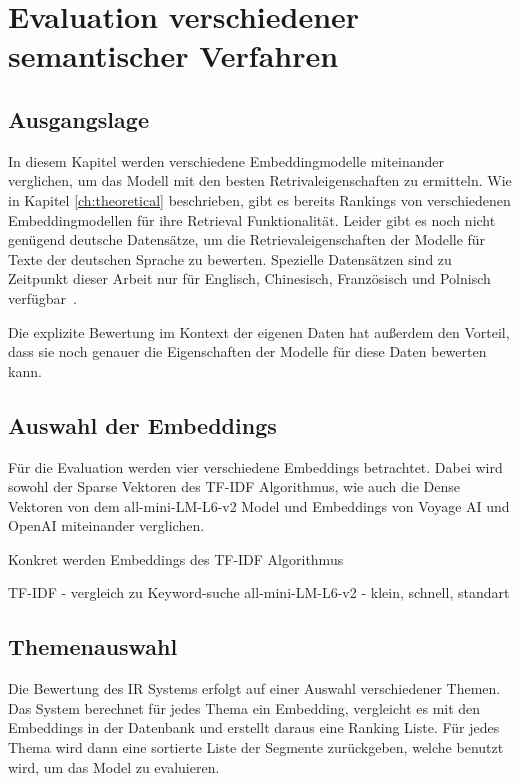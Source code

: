 \chapter{Evaluation verschiedener semantischer Verfahren}\label{ch:experiments}

\section{Ausgangslage}

In diesem Kapitel werden verschiedene Embeddingmodelle miteinander verglichen, um das Modell mit den besten Retrivaleigenschaften zu ermitteln.
Wie in Kapitel \autoref*{ch:theoretical} beschrieben, gibt es bereits Rankings von verschiedenen Embeddingmodellen für ihre Retrieval Funktionalität.
Leider gibt es noch nicht genügend deutsche Datensätze, um die Retrievaleigenschaften der Modelle für Texte der deutschen Sprache zu bewerten.
Spezielle Datensätzen sind zu Zeitpunkt dieser Arbeit nur für Englisch, Chinesisch, Französisch und Polnisch verfügbar~\cite{mteb}.

Die explizite Bewertung im Kontext der eigenen Daten hat außerdem den Vorteil, dass sie noch genauer die Eigenschaften der Modelle für diese Daten bewerten kann.


\section{Auswahl der Embeddings}

Für die Evaluation werden vier verschiedene Embeddings betrachtet.
Dabei wird sowohl der Sparse Vektoren des TF-IDF Algorithmus, wie auch die Dense Vektoren von dem all-mini-LM-L6-v2 Model und Embeddings von Voyage AI und OpenAI miteinander verglichen.

Konkret werden Embeddings des TF-IDF Algorithmus

TF-IDF - vergleich zu Keyword-suche
all-mini-LM-L6-v2 - klein, schnell, standart


\section{Themenauswahl}

Die Bewertung des IR Systems erfolgt auf einer Auswahl verschiedener Themen.
Das System berechnet für jedes Thema ein Embedding, vergleicht es mit den Embeddings in der Datenbank und erstellt daraus eine Ranking Liste.
Für jedes Thema wird dann eine sortierte Liste der Segmente zurückgeben, welche benutzt wird, um das Model zu evaluieren.

